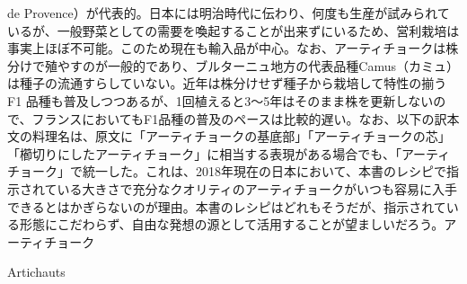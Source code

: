 \begin{main}
{{{{  de
  Provence）が代表的。日本には明治時代に伝わり、何度も生産が試みられているが、一般野菜としての需要を喚起することが出来ずにいるため、営利栽培は事実上ほぼ不可能。このため現在も輸入品が中心。なお、アーティチョークは株分けで殖やすのが一般的であり、ブルターニュ地方の代表品種Camus（カミュ）は種子の流通すらしていない。近年は株分けせず種子から栽培して特性の揃う
  F1
  品種も普及しつつあるが、1回植えると3〜5年はそのまま株を更新しないので、フランスにおいてもF1品種の普及のペースは比較的遅い。なお、以下の訳本文の料理名は、原文に「アーティチョークの基底部」「アーティチョークの芯」「櫛切りにしたアーティチョーク」に相当する表現がある場合でも、「アーティチョーク」で統一した。これは、2018年現在の日本において、本書のレシピで指示されている大きさで充分なクオリティのアーティチョークがいつも容易に入手できるとはかぎらないのが理由。本書のレシピはどれもそうだが、指示されている形態にこだわらず、自由な発想の源として活用することが望ましいだろう。}}{アーティチョーク}}\label{artichauts}}

\begin{frsecbenv}

Artichauts

\end{frsecbenv}


\end{main}

